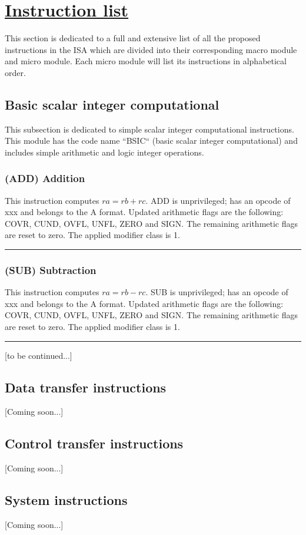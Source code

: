 \section[Instruction list]{\LARGE\underline{Instruction list}} %

    \vspace{10pt}

    This section is dedicated to a full and extensive list of all the proposed instructions in the ISA which are divided into their corresponding macro module and micro module. Each micro module will list its instructions in alphabetical order.

    \subsection{Basic scalar integer computational}

        \vspace{10pt}

        This subsection is dedicated to simple scalar integer computational instructions. This module has the code name ``BSIC`` (basic scalar integer computational) and includes simple arithmetic and logic integer operations.

        \subsubsection{(ADD) Addition}

            This instruction computes \(ra = rb + rc\). ADD is unprivileged; has an opcode of xxx and belongs to the A format. Updated arithmetic flags are the following: COVR, CUND, OVFL, UNFL, ZERO and SIGN. The remaining arithmetic flags are reset to zero. The applied modifier class is 1.

        \par\noindent\rule{\textwidth}{0.4pt}

        \subsubsection{(SUB) Subtraction}

            This instruction computes \(ra = rb - rc\). SUB is unprivileged; has an opcode of xxx and belongs to the A format. Updated arithmetic flags are the following: COVR, CUND, OVFL, UNFL, ZERO and SIGN. The remaining arithmetic flags are reset to zero. The applied modifier class is 1.

        \par\noindent\rule{\textwidth}{0.4pt}

        [to be continued...]

    \subsection{Data transfer instructions}

        [Coming soon...]

    \subsection{Control transfer instructions}

        [Coming soon...]

    \subsection{System instructions}

        [Coming soon...]